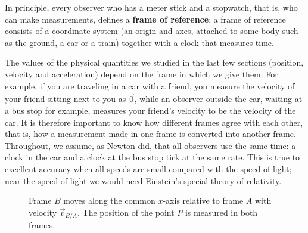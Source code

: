 \documentclass[11pt,a4paper]{article}
\begin{document}
In principle, every observer who has a meter stick and a stopwatch, that is, who can make
measurements, defines a \textbf{frame of reference}: a frame of reference consists of a coordinate
system (an origin and axes, attached to some body such as the ground, a car or a train) together
with a clock that measures time.

The values of the physical quantities we studied in the last few sections (position, velocity and
acceleration) depend on the frame in which we give them. For example, if you are traveling in a car
with a friend, you measure the velocity of your friend sitting next to you as $\vec{0}$, while an
observer outside the car, waiting at a bus stop for example, measures your friend's velocity to be
the velocity of the car. It is therefore important to know how different frames agree with each
other, that is, how a measurement made in one frame is converted into another frame. Throughout, we
assume, as Newton did, that all observers use the same time: a clock in the car and a clock at the
bus stop tick at the same rate. This is true to excellent accuracy when all speeds are small
compared with the speed of light; near the speed of light we would need Einstein's special theory
of relativity.

\begin{figure}[ht]
\centering
\begin{minipage}[c]{0.52\textwidth}
\centering
{}
\end{minipage}\hfill
\begin{minipage}[c]{0.42\textwidth}
\caption{Frame $B$ moves along the common $x$-axis relative to frame $A$ with velocity
$\vec{v}_{B/A}$. The position of the point $P$ is measured in both frames.}\label{fig:relative}
\end{minipage}
\end{figure}
\end{document}
